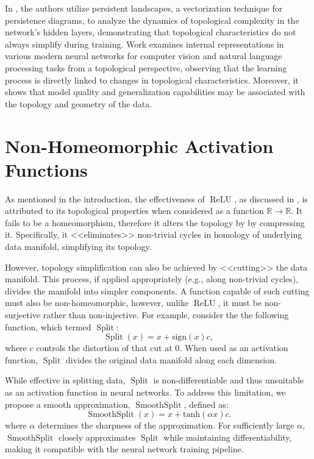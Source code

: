 \documentclass{esannV2}
\DeclareMathOperator{\relu}{\mathrm{ReLU}}
\DeclareMathOperator{\signsplit}{\mathrm{Split}}
\DeclareMathOperator{\smoothsplit}{\mathrm{SmoothSplit}}
\begin{document}
In \cite{activation_lands}, the authors utilize persistent landscapes, a vectorization technique for persistence diagrams, to analyze the dynamics of topological complexity in the network's hidden layers, demonstrating that topological characteristics do not always simplify during training. Work \cite{magai2023deep} examines internal representations in various modern neural networks for computer vision and natural language processing tasks from a topological perspective, observing that the learning process is directly linked to changes in topological characteristics. Moreover, it shows that model quality and generalization capabilities may be associated with the topology and geometry of the data.

\section{Non-Homeomorphic Activation Functions}
As mentioned in the introduction, the effectiveness of $\relu$, as discussed in \cite{top_of_DNN}, is attributed to its topological properties when considered as a function $\mathbb{R}\to\mathbb{R}$. It fails to be a homeomorphism, therefore it alters the topology by by compressing it. Specifically, it <<eliminates>> non-trivial cycles in homology of underlying data manifold, simplifying its topology.

However, topology simplification can also be achieved by <<cutting>> the data manifold. This process, if applied appropriately (e.g., along non-trivial cycles), divides the manifold into simpler components. A function capable of such cutting must also be non-homeomorphic, however, unlike $\relu$, it must be non-surjective rather than non-injective. For example, consider the the following function, which termed $\signsplit$: $$ \signsplit(x) = x + \mathrm{sign}(x)c,$$
where $c$ controls the distortion of that cut at $0$. When used as an activation function, $\signsplit$ divides the original data manifold along each dimension.

While effective in splitting data, $\signsplit$ is non-differentiable and thus unsuitable as an activation function in neural networks. To address this limitation, we propose a smooth approximation, \( \smoothsplit \), defined as: $$\smoothsplit(x) = x + \mathrm{tanh}(\alpha x)c.$$
where $\alpha$ determines the sharpness of the approximation. For sufficiently large $\alpha$, \( \smoothsplit \) closely approximates \( \signsplit \) while maintaining differentiability, making it compatible with the neural network training pipeline.
\end{document}
